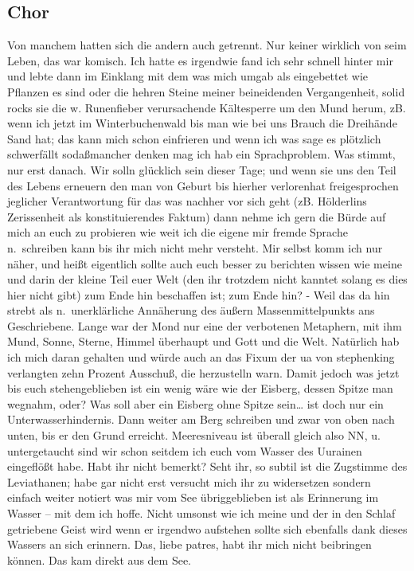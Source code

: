 \documentclass[
]{article}
\author{}
\date{\vspace{-2.5em}}
\begin{document}
\subsection{Chor}\label{chor}

Von manchem hatten sich die andern auch getrennt. Nur keiner wirklich
von seim Leben, das war komisch. Ich hatte es irgendwie fand ich sehr
schnell hinter mir und lebte dann im Einklang mit dem was mich umgab als
eingebettet wie Pflanzen es sind oder die hehren Steine meiner
beineidenden Vergangenheit, solid rocks sie die w. Runenfieber
verursachende Kältesperre um den Mund herum, zB. wenn ich jetzt im
Winterbuchenwald bis man wie bei uns Brauch die Dreihände Sand hat; das
kann mich schon einfrieren und wenn ich was sage es plötzlich
schwerfällt sodaßmancher denken mag ich hab ein Sprachproblem. Was
stimmt, nur erst danach. Wir solln glücklich sein dieser Tage; und wenn
sie uns den Teil des Lebens erneuern den man von Geburt bis hierher
verlorenhat freigesprochen jeglicher Verantwortung für das was nachher
vor sich geht (zB. Hölderlins Zerissenheit als konstituierendes Faktum)
dann nehme ich gern die Bürde auf mich an euch zu probieren wie weit ich
die eigene mir fremde Sprache n.~schreiben kann bis ihr mich nicht mehr
versteht. Mir selbst komm ich nur näher, und heißt eigentlich sollte
auch euch besser zu berichten wissen wie meine und darin der kleine Teil
euer Welt (den ihr trotzdem nicht kanntet solang es dies hier nicht
gibt) zum Ende hin beschaffen ist; zum Ende hin? - Weil das da hin
strebt als n.~unerklärliche Annäherung des äußern Massenmittelpunkts ans
Geschriebene. Lange war der Mond nur eine der verbotenen Metaphern, mit
ihm Mund, Sonne, Sterne, Himmel überhaupt und Gott und die Welt.
Natürlich hab ich mich daran gehalten und würde auch an das Fixum der ua
von stephenking verlangten zehn Prozent Ausschuß, die herzustelln warn.
Damit jedoch was jetzt bis euch stehengeblieben ist ein wenig wäre wie
der Eisberg, dessen Spitze man wegnahm, oder? Was soll aber ein Eisberg
ohne Spitze sein\ldots{} ist doch nur ein Unterwasserhindernis. Dann
weiter am Berg schreiben und zwar von oben nach unten, bis er den Grund
erreicht. Meeresniveau ist überall gleich also NN, u. untergetaucht sind
wir schon seitdem ich euch vom Wasser des Uurainen eingeflößt habe. Habt
ihr nicht bemerkt? Seht ihr, so subtil ist die Zugstimme des
Leviathanen; habe gar nicht erst versucht mich ihr zu widersetzen
sondern einfach weiter notiert was mir vom See übriggeblieben ist als
Erinnerung im Wasser -- mit dem ich hoffe. Nicht umsonst wie ich meine
und der in den Schlaf getriebene Geist wird wenn er irgendwo aufstehen
sollte sich ebenfalls dank dieses Wassers an sich erinnern. Das, liebe
patres, habt ihr mich nicht beibringen können. Das kam direkt aus dem
See.
\end{document}
